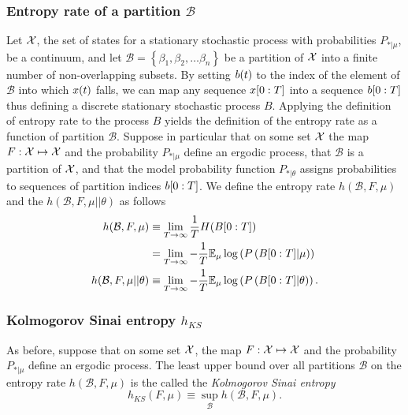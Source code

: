 \subsubsection{Entropy rate of a partition $\mathcal{B}$}
 Let ${\cal X}$, the set of states for a
stationary stochastic process with probabilities $P_{*|\mu}$, be a
continuum, and let $\mathcal{B} = \left\{ \beta_1,\beta_2,\ldots
  \beta_n \right\}$ be a partition of ${\cal X}$ into a finite number
of non-overlapping subsets.  By setting ${b}{(t)}$ to the index of
the element of $\mathcal{B}$ into which ${x}{(t)}$ falls, we can map
any sequence $x[0:T]$ into a sequence $b[0:T]$ thus
defining a discrete stationary stochastic process $B$.  Applying the
definition of entropy rate to the process $B$ yields the definition of
the entropy rate as a function of partition $\mathcal{B}$.  Suppose in
particular that on some set ${\cal X}$ the map $F:{\cal X}\mapsto{\cal
  X}$ and the probability $P_{*|\mu}$ define an ergodic process, that
$\mathcal{B}$ is a partition of ${\cal X}$, and that the model
probability function $P_{*|\theta}$ assigns probabilities to sequences
of partition indices $b[0:T]$.  We define the entropy rate $
h(\mathcal{B},F,\mu)$ and the  %
$h(\mathcal{B},F,\mu||\theta)$ as follows
\begin{align}
  \label{eq:hrate6}
  h(\mathcal{B},F,\mu) &\equiv \lim_{T \rightarrow \infty} \frac{1}{T}
  H(B[0:T]) \\
  &= \lim_{T \rightarrow \infty} -\frac{1}{T} \mathbb{E}_\mu \log\left(P
  \left(B[0:T]| \mu \right) \right) \nonumber\\
  \label{eq:hrate7}
  h(\mathcal{B},F,\mu||\theta) &\equiv \lim_{T \rightarrow \infty}
  -\frac{1}{T} \mathbb{E}_\mu \log\left(P \left(B[0:T] | \theta \right)
  \right). \nonumber  
\end{align}
\subsubsection{Kolmogorov Sinai entropy $h_{KS}$}
%
%
%
As before, suppose that on some set ${\cal X}$, the map $F:{\cal
  X}\mapsto{\cal X}$ and the probability $P_{*|\mu}$ define an ergodic
process.  The least upper bound over all partitions $\mathcal{B}$ on
the entropy rate $h(\mathcal{B},F,\mu)$ is the called the
\emph{Kolmogorov Sinai entropy}
\begin{equation}
  \label{eq:hKS}
  h_{KS}(F,\mu) \equiv \sup_{\mathcal{B}} h(\mathcal{B},F,\mu).
\end{equation}

